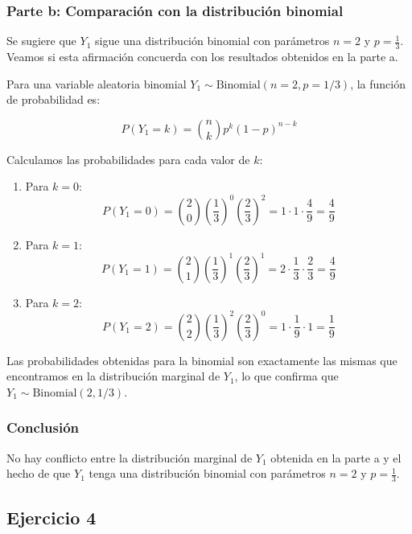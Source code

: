 \documentclass[
]{article}
\begin{document}
\subsubsection{Parte b: Comparación con la distribución binomial}\label{parte-b-comparaciuxf3n-con-la-distribuciuxf3n-binomial}

Se sugiere que \(Y_1\) sigue una distribución binomial con parámetros \(n = 2\) y \(p = \frac{1}{3}\). Veamos si esta afirmación concuerda con los resultados obtenidos en la parte a.

Para una variable aleatoria binomial \(Y_1 \sim \text{Binomial}(n=2, p=1/3)\), la función de probabilidad es:

\[
P(Y_1 = k) = \binom{n}{k} p^k (1 - p)^{n - k}
\]

Calculamos las probabilidades para cada valor de \(k\):

\begin{enumerate}
\def\labelenumi{\arabic{enumi}.}
\item
  Para \(k = 0\):
  \[
  P(Y_1 = 0) = \binom{2}{0} \left(\frac{1}{3}\right)^0 \left(\frac{2}{3}\right)^2 = 1 \cdot 1 \cdot \frac{4}{9} = \frac{4}{9}
  \]
\item
  Para \(k = 1\):
  \[
  P(Y_1 = 1) = \binom{2}{1} \left(\frac{1}{3}\right)^1 \left(\frac{2}{3}\right)^1 = 2 \cdot \frac{1}{3} \cdot \frac{2}{3} = \frac{4}{9}
  \]
\item
  Para \(k = 2\):
  \[
  P(Y_1 = 2) = \binom{2}{2} \left(\frac{1}{3}\right)^2 \left(\frac{2}{3}\right)^0 = 1 \cdot \frac{1}{9} \cdot 1 = \frac{1}{9}
  \]
\end{enumerate}

Las probabilidades obtenidas para la binomial son exactamente las mismas que encontramos en la distribución marginal de \(Y_1\), lo que confirma que \(Y_1 \sim \text{Binomial}(2, 1/3)\).

\subsubsection{Conclusión}\label{conclusiuxf3n-2}

No hay conflicto entre la distribución marginal de \(Y_1\) obtenida en la parte a y el hecho de que \(Y_1\) tenga una distribución binomial con parámetros \(n = 2\) y \(p = \frac{1}{3}\).

\subsection{Ejercicio 4}\label{ejercicio-4}
\end{document}
